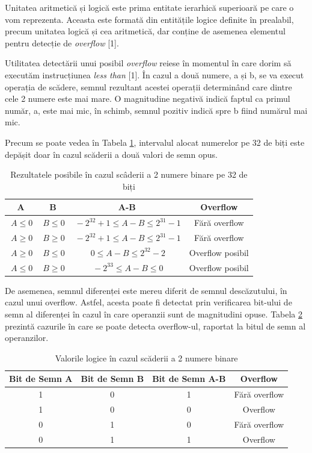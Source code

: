 \documentclass[12pt]{article}
\begin{document}
Unitatea aritmetică și logică este prima entitate ierarhică superioară pe care o vom reprezenta. Aceasta este formată din entitățile logice definite în prealabil, precum unitatea logică și cea aritmetică, dar conține de asemenea elementul pentru detecție de \textit{overflow} [1].

Utilitatea detectării unui posibil \textit{overflow} reiese în momentul în care dorim să executăm instrucțiunea \textit{less than} [1]. În cazul a două numere, a și b, se va execut operația de scădere, semnul rezultant acestei operații determinând care dintre cele 2 numere este mai mare. O magnitudine negativă indică faptul ca primul număr, a, este mai mic, în schimb, semnul pozitiv indică spre b fiind numărul mai mic.

Precum se poate vedea în Tabela \ref{Tabela:14}, intervalul alocat numerelor pe 32 de biți este depășit doar în cazul scăderii a două valori de semn opus.

\begin{table}[h]
\centering
\begin{tabular}{ ||c|c|c|c|| }
 \hline
 A & B & A-B & Overflow\\ 
 \hline  \hline
  $\ A \le 0$ & $\ B \le 0$ & $\ -2^{32} +1\le A-B \le 2^{31} - 1$ & Fără overflow \\
 \hline
  $\ A \ge 0$ & $\ B \ge 0$ & $\ -2^{32} +1\le A-B \le 2^{31} - 1$ & Fără overflow \\
 \hline
  $\ A \ge 0$ & $\ B \le 0$ & $\ 0 \le A-B \le 2^{32} - 2$ &  Overflow posibil\\
 \hline
  $\ A \le 0$ & $\ B \ge 0$ & $\ -2^{33} \le A-B \le 0$ &   Overflow posibil\\
 
  \hline  
\end{tabular}
\caption{Rezultatele posibile în cazul scâderii a 2 numere binare pe 32 de biți}
\label{Tabela:14}
\end{table}

De asemenea, semnul diferenței este mereu diferit de semnul descăzutului, în cazul unui overflow. Astfel, acesta poate fi detectat prin verificarea bit-ului de semn al diferenței în cazul în care operanzii sunt de magnitudini opuse. Tabela \ref{Tabela:15} prezintă cazurile în care se poate detecta overflow-ul, raportat la bitul de semn al operanzilor.

\begin{table}[h]
\centering
\begin{tabular}{ ||c|c|c|c|| }
 \hline
 Bit de Semn A &  Bit de Semn B &  Bit de Semn A-B & Overflow\\ 
 \hline  \hline
  1 & 0& 1 & Fără overflow \\
  \hline
  1 & 0& 0 & Overflow \\
 \hline
  0 & 1& 0 & Fără overflow \\
 \hline
 0 &1& 1 &  Overflow \\
  \hline  
\end{tabular}
\caption{Valorile logice în cazul scăderii a 2 numere binare}
\label{Tabela:15}
\end{table}
\end{document}
